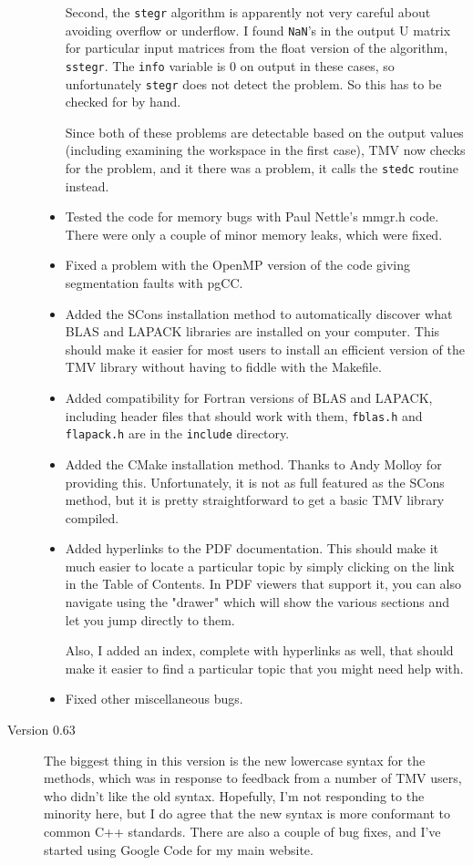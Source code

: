 \documentclass[twoside,letterpaper,11pt]{article}
\renewcommand{\tt}[1]{{\lstinline {#1}}}
\begin{document}
\begin{description}
\begin{itemize}
Second, the \tt{stegr} algorithm is apparently not very careful about avoiding overflow or underflow.
I found \tt{NaN}'s in the output U matrix for particular input matrices from the float version
of the algorithm, \tt{sstegr}.  The \tt{info} variable is 0 on output in these cases, so unfortunately
\tt{stegr} does not detect the problem.  So this has to be checked for by hand.

Since both of these problems are detectable based on the output values (including examining
the workspace in the first case), TMV now checks for the problem, and it there was a problem,
it calls the \tt{stedc} routine instead.
\item
Tested the code for memory bugs with Paul Nettle's mmgr.h code.  There were only a couple of 
minor memory leaks, which were fixed.
\item
Fixed a problem with the OpenMP version of the code giving segmentation faults with pgCC.
\item
Added the SCons installation method to automatically discover what BLAS and LAPACK libraries 
are installed on your computer.  This should make it easier for most users to install an efficient
version of the TMV library without having to fiddle with the Makefile.
\item
Added compatibility for Fortran versions of BLAS and LAPACK, including header files that
should work with them, \texttt{fblas.h} and \texttt{flapack.h} are in the \texttt{include} directory.
\item
Added the CMake installation method.  Thanks to Andy Molloy for providing this.  Unfortunately,
it is not as full featured as the SCons method, but it is pretty straightforward to get
a basic TMV library compiled.
\item
Added hyperlinks to the PDF documentation.  This should make it much easier to locate a particular topic by simply clicking on the link in the Table of Contents.  In PDF viewers that support it, you can 
also navigate using the "drawer" which will show the various sections and let you jump directly to them.

Also, I added an index, complete with hyperlinks as well, that should make it easier to find a particular topic that you might need help with.
\item
Fixed other miscellaneous bugs.

\end{itemize}

\item[Version 0.63]
The biggest thing in this version is the new lowercase syntax for the
methods, which was in response to feedback from a number of TMV users, 
who didn't like the old syntax.  Hopefully, I'm not responding to the 
minority here, but I do agree that the new syntax is more conformant 
to common C++ standards.  There are also a couple of bug fixes, and I've
started using Google Code for my main website.


\end{description}
\end{document}
